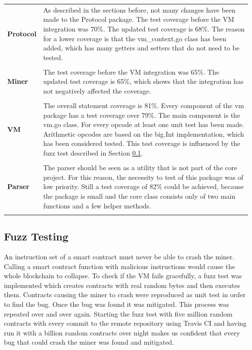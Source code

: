 \begin{tabular}[t]{ p{3cm} p{12.5cm}}
\raggedright
\textbf{Protocol} &
As described in the sections before, not many changes have been made to the Protocol package. The test coverage before the VM integration was 70\%. The updated test coverage is 68\%. The reason for a lower coverage is that the vm\_context.go class has been added, which has many getters and setters that do not need to be tested. \\ \\
\textbf{Miner} &
The test coverage before the VM integration was 65\%. The updated test coverage is 65\%, which shows that the integration has not negatively affected the coverage. \\ \\
\textbf{VM} &
The overall statement coverage is 81\%. Every component of the vm package has a test coverage over 79\%. The main component is the vm.go class. For every opcode at least one unit test has been made. Arithmetic opcodes are based on the big.Int implementation, which has been considered tested. This test coverage is influenced by the fuzz test described in Section \ref{fuzz_testing}. \\ \\
\textbf{Parser} &
The parser should be seen as a utility that is not part of the core project. For this reason, the necessity to test of this package was of low priority. Still a test coverage of 82\% could be achieved, because the package is small and the core class consists only of two main functions and a few helper methods. \\ \\
\end{tabular}

\subsection{Fuzz Testing} \label{fuzz_testing}
An instruction set of a smart contract must never be able to crash the miner. Calling a smart contract function with malicious instructions would cause the whole blockchain to collapse. To check if the VM fails gracefully, a fuzz test was implemented which creates contracts with real random bytes and then executes them. Contracts causing the miner to crash were reproduced as unit test in order to find the bug. Once the bug was found it was mitigated. This process was repeated over and over again. Starting the fuzz test with five million random contracts with every commit to the remote repository using Travis CI and having run it with a billion random contracts over night makes us confident that every bug that could crash the miner was found and mitigated.

